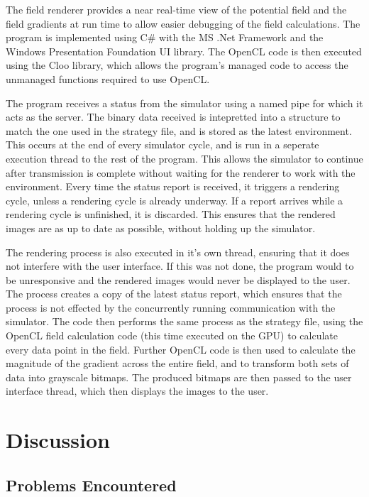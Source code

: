 \documentclass[10pt]{article}
\begin{document}
The field renderer provides a near real-time view of the potential field and the
field gradients at run time to allow easier debugging of the field calculations.
The program is implemented using C\# with the MS .Net Framework and the Windows
Presentation Foundation UI library. The OpenCL code is then executed using the
Cloo library, which allows the program's managed code to access the unmanaged
functions required to use OpenCL.

The program receives a status from the simulator using a named pipe for which it
acts as the server. The binary data received is intepretted into a structure to
match the one used in the strategy file, and is stored as the latest
environment. This occurs at the end of every simulator cycle, and is run in a
seperate execution thread to the rest of the program. This allows the simulator
to continue after transmission is complete without waiting for the renderer to
work with the environment. Every time the status report is received, it triggers
a rendering cycle, unless a rendering cycle is already underway. If a report
arrives while a rendering cycle is unfinished, it is discarded. This ensures
that the rendered images are as up to date as possible, without holding up the
simulator.

The rendering process is also executed in it's own thread, ensuring that it does
not interfere with the user interface. If this was not done, the program would
to be unresponsive and the rendered images would never be displayed to the user.
The process creates a copy of the latest status report, which ensures that the
process is not effected by the concurrently running communication with the
simulator. The code then performs the same process as the strategy file, using
the OpenCL field calculation code (this time executed on the GPU) to
calculate every data point in the field. Further OpenCL code is then used to
calculate the magnitude of the gradient across the entire field, and to
transform both sets of data into grayscale bitmaps. The produced bitmaps are
then passed to the user interface thread, which then displays the images to the
user.

\section{Discussion}

\subsection{Problems Encountered} 
\end{document}

